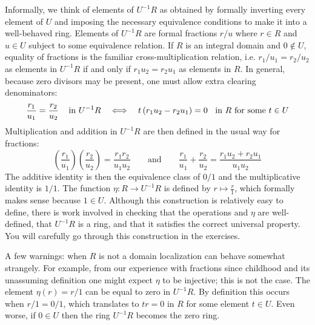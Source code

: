 \documentclass[12pt,reqno]{amsart}
\begin{document}
Informally, we think of elements of $U^{-1}R$ as obtained by formally inverting every element of $U$ and imposing the necessary equivalence conditions to make it into a well-behaved ring. Elements of $U^{-1}R$ are formal fractions $r/u$ where $r\in R$ and $u \in U$ subject to some equivalence relation. If $R$ is an integral domain and $0\notin U$, equality of fractions is the familiar cross-multiplication relation, i.e. $r_{1}/u_{1} = r_{2}/u_{2}$ as elements in $U^{-1}R$ if and only if $r_{1}u_{2}=r_{2}u_{1}$ as elements in $R$. In general, because zero divisors may be present, one must allow extra clearing denominators:
\[
\frac{r_{1}}{u_1}=\frac{r_2}{u_2} \text{\;\;\; in $U^{-1}R$} 
\quad \Longleftrightarrow \quad
t\left(r_{1}u_{2}-r_{2}u_{1}\right) = 0 \text{\;\; in $R$ for some $t\in U$}
\]
Multiplication and addition in $U^{-1}R$ are then defined in the usual way for fractions:
\[
\left(\frac{r_{1}}{u_1}\right)\left(\frac{r_2}{u_2}\right)=\frac{r_1r_2}{u_1u_2} \quad \quad \text{and} \quad \quad \frac{r_{1}}{u_1}+\frac{r_2}{u_2} = \frac{r_1u_{2}+r_{2}u_{1}}{u_1u_2}
\]
The additive identity is then the equivalence class of $0/1$ and the multiplicative identity is $1/1$. The function $\eta:R \to U^{-1}R$ is defined by $r \mapsto \frac{r}{1}$, which formally makes sense because $1 \in U$. Although this construction is relatively easy to define, there is work involved in checking that the operations and $\eta$ are well-defined, that $U^{-1}R$ is a ring, and that it satisfies the correct universal property. You will carefully go through this construction in the exercises. 

A few warnings: when $R$ is not a domain localization can behave somewhat strangely. For example, from our experience with fractions since childhood and its unassuming definition one might expect $\eta$ to be injective; this is not the case. The element $\eta(r)=r/1$ can be equal to zero in $U^{-1}R$. By definition this occurs when $r/1 = 0/1$, which translates to $tr=0$ in $R$ for some element $t\in U$. Even worse, if $0 \in U$ then the ring $U^{-1}R$ becomes the zero ring. 

\hrulefill
\end{document}
